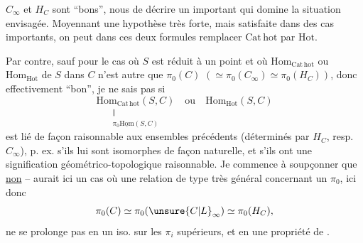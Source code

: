 $C_\infty$ et $H_C$ sont ``bons'',  nous  de décrire un  important qui domine la situation envisagée. Moyennant une hypothèse très forte, mais  satisfaite dans des cas importants, on peut dans ces deux formules remplacer $\mathrm{Cat\,hot}$ par $\mathrm{Hot}$.

 Par contre, sauf pour le cas où $S$ est réduit à un point et où $\mathrm{Hom}_{\mathrm{Cat\,hot}}$ ou $\mathrm{Hom}_{\mathrm{Hot}}$ de $S$ dans $C$ n'est autre que $\pi_0(C)$ $(\simeq\pi_0(C_\infty)\simeq \pi_0(H_C))$, donc effectivement ``bon'', je ne sais pas si
\[
\underset{\substack{\Vert\\\pi_0\underline{\mathrm{Hom}}(S,C)}}{\mathrm{Hom}_{\mathrm{Cat\,hot}}(S,C)}
\quad\text{ou}\quad\mathrm{Hom}_{\mathrm{Hot}}(S,C)
\]
est lié de façon raisonnable aux  ensembles précédents (déterminés par $H_C$, resp.\  $C_\infty$),   p. ex. s'ils lui sont isomorphes de façon naturelle, et s'ils ont une signification géométrico-topologique raisonnable. Je commence à soupçonner que \uline{non} --  aurait ici un cas où une relation  de type très général concernant un $\pi_0$, ici donc
\[
\pi_0(C)\simeq\pi_0(\unsure{C|L}_\infty)\simeq\pi_0(H_C),
\]
ne se prolonge pas en un iso. sur les $\pi_i$ supérieurs, et en une  propriété de .

